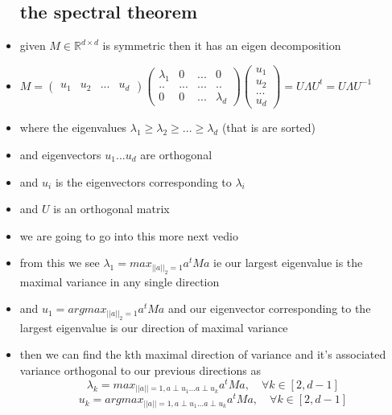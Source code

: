 \documentclass{article}
\begin{document}
\begin{itemize}
\subsection*{the spectral theorem}
\item given $M\in \mathbb{R}^{d\times d}$ is symmetric then it has an eigen decomposition 
\item $M=\begin{pmatrix} u_1 & u_2 & ...& u_d\end{pmatrix}\begin{pmatrix} \lambda_1 & 0 & ...& 0\\
    ..& ... & ...& ..\\
    0 & 0 & ...& \lambda_d\end{pmatrix}\begin{pmatrix} u_1 \\ u_2 \\ ... \\ u_d\end{pmatrix}=U\Lambda U^t=U\Lambda U^{-1}$
\item where the eigenvalues $\lambda_1\geq \lambda_2 \geq ... \geq \lambda_d$  (that is are sorted)
\item and eigenvectors $u_1...u_d$ are orthogonal 
\item and $u_i$ is the eigenvectors corresponding  to $\lambda_i$
\item and $U$ is an orthogonal matrix
\item we are going to go into this more next vedio
\item from this we see $\lambda_1=max_{||a||_{2}=1}a^tMa$ ie our largest eigenvalue is the maximal variance in any single direction
\item and $u_1=argmax_{||a||_{2}=1}a^tMa$ and our eigenvector corresponding to the largest eigenvalue is our direction of maximal variance
\item  then we can find the kth maximal direction of variance and it's associated variance orthogonal to our previous directions as $$\lambda_{k}=max_{||a||=1, a\perp u_1 \dots a\perp u_k}a^tMa, \quad \forall k \in [2,d-1]$$
$$u_{k}=argmax_{||a||=1, a\perp u_1 \dots a\perp u_k}a^tMa, \quad \forall k \in [2,d-1]$$

\end{itemize}
\end{document}
